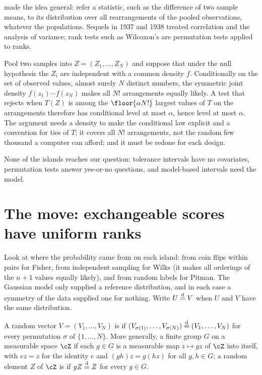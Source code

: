 \begin{refsection}
\textcite{Pitman1937} made the idea general: refer a statistic, such as the difference of two sample means, to its distribution over all rearrangements of the pooled observations, whatever the populations. Sequels in 1937 and 1938 treated correlation and the analysis of variance; rank tests such as Wilcoxon's are permutation tests applied to ranks.

\begin{aside}
Pool two samples into $Z=(Z_1,\dots,Z_N)$ and suppose that under the null hypothesis the $Z_i$ are independent with a common density $f$. Conditionally on the set of observed values, almost surely $N$ distinct numbers, the symmetric joint density $f(z_1)\cdots f(z_N)$ makes all $N!$ arrangements equally likely. A test that rejects when $T(Z)$ is among the $\floor{\alpha N!}$ largest values of $T$ on the arrangements therefore has conditional level at most $\alpha$, hence level at most $\alpha$. The argument needs a density to make the conditional law explicit and a convention for ties of $T$; it covers all $N!$ arrangements, not the random few thousand a computer can afford; and it must be redone for each design.
\end{aside}

None of the islands reaches our question: tolerance intervals have no covariates, permutation tests answer yes-or-no questions, and model-based intervals need the model.

\section{The move: exchangeable scores have uniform ranks}\label{sec:conformal:move}

Look at where the probability came from on each island: from coin flips within pairs for Fisher, from independent sampling for Wilks (it makes all orderings of the $n+1$ values equally likely), and from random labels for Pitman. The Gaussian model only supplied a reference distribution, and in each case a symmetry of the data supplied one for nothing. Write $U\overset{\mathrm{d}}{=} V$ when $U$ and $V$ have the same distribution.

\begin{definition}[Exchangeability]\label{def:conformal:exchangeable}
A random vector $V=(V_1,\dots,V_N)$ is  if $(V_{\sigma(1)},\dots,V_{\sigma(N)})\overset{\mathrm{d}}{=}(V_1,\dots,V_N)$ for every permutation $\sigma$ of $\{1,\dots,N\}$. More generally, a finite group $G$  on a measurable space $\cZ$ if each $g\in G$ is a measurable map $z\mapsto gz$ of $\cZ$ into itself, with $ez=z$ for the identity $e$ and $(gh)z=g(hz)$ for all $g,h\in G$; a random element $Z$ of $\cZ$ is  if $gZ\overset{\mathrm{d}}{=} Z$ for every $g\in G$.
\end{definition}


\end{refsection}
